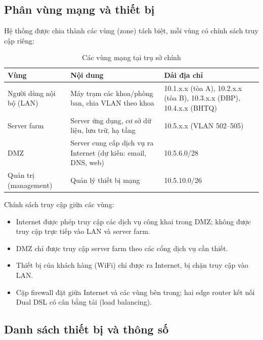 \subsection{Phân vùng mạng và thiết bị}
Hệ thống được chia thành các vùng (zone) tách biệt, mỗi vùng có chính sách truy cập riêng:

\begin{table}[H]
    \centering
    \begin{tabular}{|p{3.6cm}|p{6.8cm}|p{3cm}|}
        \hline
        \textbf{Vùng} & \textbf{Nội dung} & \textbf{Dải địa chỉ} \\ \hline
        Người dùng nội bộ (LAN) & Máy trạm các khoa/phòng ban, chia VLAN theo khoa & 10.1.x.x (tòa A), 10.2.x.x (tòa B), 10.3.x.x (ĐBP), 10.4.x.x (BHTQ) \\ \hline
        Server farm & Server ứng dụng, cơ sở dữ liệu, lưu trữ, hạ tầng & 10.5.x.x (VLAN 502--505) \\ \hline
        DMZ & Server cung cấp dịch vụ ra Internet (dự kiến: email, DNS, web) & 10.5.6.0/28 \\ \hline
        Quản trị (management) & Quản lý thiết bị mạng & 10.5.10.0/26 \\ \hline
    \end{tabular}
    \caption{Các vùng mạng tại trụ sở chính}
\end{table}

Chính sách truy cập giữa các vùng:
\begin{itemize}
    \item Internet được phép truy cập các dịch vụ công khai trong DMZ; không được truy cập trực tiếp vào LAN và server farm.
    \item DMZ chỉ được truy cập server farm theo các cổng dịch vụ cần thiết.
    \item Thiết bị của khách hàng (WiFi) chỉ được ra Internet, bị chặn truy cập vào LAN.
    \item Cặp firewall đặt giữa Internet và các vùng bên trong; hai edge router kết nối Dual DSL có cân bằng tải (load balancing).
\end{itemize}


\subsection{Danh sách thiết bị và thông số}

